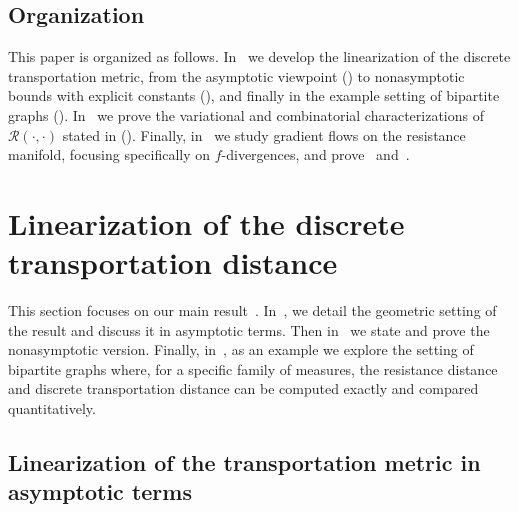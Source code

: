 \documentclass[11pt,a4paper]{article}
\newcommand{\Resis}{\mathcal{R}}
\begin{document}
\subsection{Organization}

This paper is organized as follows. In~ we develop the linearization of the discrete transportation metric, from the asymptotic viewpoint () to nonasymptotic bounds with explicit constants (), and finally in the example setting of bipartite graphs (). In~ we prove the variational and combinatorial characterizations of $\Resis(\cdot,\cdot)$ stated in  (). Finally, in~ we study gradient flows on the resistance manifold, focusing specifically on $f$-divergences, and prove~ and~.

\section{Linearization of the discrete transportation distance}\label{sec:linearization}

This section focuses on our main result~. In~, we detail the geometric setting of the result and discuss it in asymptotic terms. Then in~ we state and prove the nonasymptotic version. Finally, in~, as an example we explore the setting of bipartite graphs where, for a specific family of measures, the resistance distance and discrete transportation distance can be computed exactly and compared quantitatively.

\subsection{Linearization of the transportation metric in asymptotic terms}\label{subsec:linearization-asymptotic}
\end{document}
